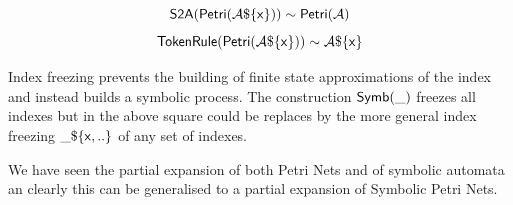 \documentclass[]{article}
\begin{document}
\begin{center}
\begin{minipage}{0.4\textwidth}\end{minipage}
\begin{minipage}{0.4\textwidth}
\[{\sf S2A(Petri(\mathcal{A}\$\{x\}))\sim  Petri(\mathcal{A}) }\]  
\[{\sf TokenRule(Petri(\mathcal{A}\$\{x\}))\sim  \mathcal{A}\$\{x\}}\]  
\end{minipage}
\end{center}

Index freezing prevents the building of  finite state approximations of the index and instead builds a symbolic process. The construction ${\sf Symb(\_)}$ freezes all indexes but in the above square could be replaces by the more general index freezing ${\sf  \_\$\{x,..\}}$ of any set of indexes.

We have seen the partial expansion of both Petri Nets and of symbolic automata an clearly this can be generalised to a partial expansion of Symbolic Petri Nets.
\end{document}
